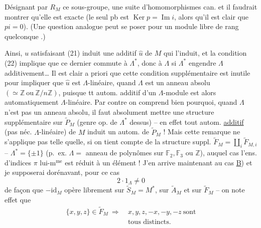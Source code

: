 Désignant par $R_M$ ce sous-groupe,
une suite d'homomorphismes can.
et il faudrait montrer qu'elle est
exacte (le seul pb  est $\operatorname{Ker}p=\operatorname{Im}i$,
alors qu'il est clair que $pi=0$). (Une
question analogue peut se poser pour un
module libre de rang quelconque .)

Ainsi, $u$ satisfaisant (21) induit une
 additif $\widehat u$ de $M$ qui l'induit,
et la condition (22) implique que ce
dernier commute à $\Lambda^*$, donc à $\Lambda$ si $\Lambda^*$
engendre $\Lambda$ additivement\ldots{} Il est clair a
priori que cette condition supplémentaire
est inutile pour impliquer que $\widehat u$ est
$\Lambda$-linéaire, quand $\Lambda$ est un anneau
absolu $(\simeq\mathbb Z\ \text{ou}\ \mathbb Z/n\mathbb Z)$, puisque tt
autom. additif d'un $\Lambda$-module est
alors automatiquement $\Lambda$-linéaire. Par
contre on comprend bien pourquoi,
quand $\Lambda$ n'est pas un anneau absolu,
il faut absolument mettre une structure
supplémentaire sur $\widetilde P_M$  (genre op. de $\Lambda^*$
dessus) -- en effet tout autom. \uline{additif}
(pas néc. $\Lambda$-linéaire) de $M$ induit un
autom. de $\widetilde P_M$ ! Mais cette remarque
ne s'applique pas telle quelle, si on
tient compte de la structure suppl.
$\widetilde F_M=\coprod_i\widetilde F_{M,i}$ --   $\Lambda^*=\{\pm1\}$
(p.~ex. $\Lambda=$  anneau de polynômes sur
$\mathbb F_2,\mathbb F_3$ ou $\mathbb Z$), auquel cas l'ens. d'indices
$\pi$ lui-m$^{\text{me}}$ est réduit à un élément !
J'en arrive maintenant au cas \uline{B})
et je supposerai dorénavant, pour ce cas
\[
\boxed{2\cdot1_\Lambda\ne0}\tag*{(25)}
\]
de façon que  $-\mathrm{id}_M$ opère librement sur
$\widetilde S_M=M^*$, sur $\widetilde A_M$ et sur $\widetilde F_M$ -- on
note  effet que
\[
\begin{aligned}
\{x,y,z\}\in\widetilde F_M\ \Longrightarrow\ &x,y,z,-x,-y,-z\ \text{sont}\\
&\text{tous distincts}.
\end{aligned}\tag*{(26)}
\]


